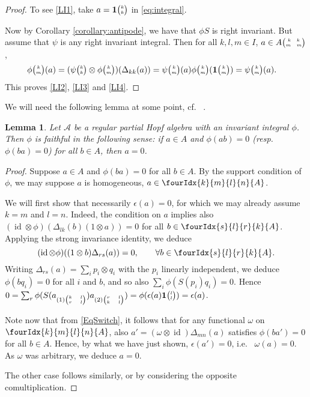 \documentclass[11pt]{article}
\DeclareMathOperator{\id}{id}
\newcommand{\Grt}[3]{#1{\tiny {\begin{pmatrix} #2\\#3\end{pmatrix}}}}
\newcommand{\UnitC}[2]{\Grt{\mathbf{1}}{#1}{#2}}
\newcommand{\pmat}[4]{{\tiny \begin{pmatrix} #1 \quad #2 \\ #3 \quad #4\end{pmatrix}}}
\newcommand{\Gr}[5]{\fourIdx{#2}{#4}{#3}{#5}{#1}}%
\newtheorem{Lem}[Theorem]{Lemma}
\theoremstyle{definition}
\newcommand{\phic}[2]{\Grt{\phi}{#1}{#2}}
\numberwithin{equation}{section}
\begin{document}
\begin{proof} 
To see \ref{LI1}, take $a=\UnitC{k}{k}$ in \eqref{eq:integral}. 

Now by Corollary \ref{corollary:antipode}, we have that $\phi S$ is right invariant. But assume that $\psi$ is any
 right invariant integral.     Then for all $k,l,m\in I$, $a\in A\pmat{k}{k}{m}{m}$,
    \begin{align*}
      \phic{k}{m}(a)  &= (\Grt{\psi}{k}{k} \otimes
      \phic{k}{m})(\Delta_{kk}(a)) = \Grt{\psi}{k}{m}(a)\Grt{\phi}{k}{m}(\UnitC{k}{m}) = \Grt{\psi}{k}{m}(a) .
    \end{align*}
  This proves \ref{LI2}, \ref{LI3} and \ref{LI4}.  
     \end{proof} 


We will need the following lemma at some point, cf.~ \cite[Proposition 3.4]{VDae2}.

\begin{Lem}\label{LemFaith} Let $\mathscr{A}$ be a regular partial Hopf
  algebra with an invariant integral $\phi$. Then
  $\phi$ is faithful in the following sense: if $a\in A$ and
  $\phi(ab) =0$ (resp. $\phi(ba)=0$) for all $b\in A$, then
  $a=0$.
\end{Lem} 

\begin{proof} Suppose $a\in A$ and $\phi(ba)=0$ for all $b\in A$. By the support condition of $\phi$, we may suppose $a$ is homogeneous, $a\in \Gr{A}{k}{l}{m}{n}$.

We will first show that necessarily $\epsilon(a)=0$, for which we may already assume $k=m$ and $l=n$. Indeed, the condition on $a$ implies also $(\id\otimes \phi)(\Delta_{lk}(b)(1\otimes a))=0$ for all $b\in \Gr{A}{s}{r}{l}{k}$. Applying the strong invariance identity, we deduce \begin{equation}\label{EqSwitch}(\id\otimes \phi)((1\otimes b)\Delta_{rs}(a))=0,\qquad \forall b\in \Gr{A}{s}{r}{l}{k}.\end{equation} Writing $\Delta_{rs}(a) = \sum_i p_i\otimes q_i$ with the $p_i$ linearly independent, we deduce $\phi(bq_i)=0$ for all $i$ and $b$, and so also $\sum_i \phi(S(p_i)q_i)=0$. Hence $0=\sum_r \phi(S(a_{(1){\tiny \begin{pmatrix} k & l \\ r & l \end{pmatrix}}})a_{(2){\tiny \begin{pmatrix} r & l \\ k & l\end{pmatrix}}}) = \phi(\epsilon(a) \UnitC{l}{l}) = \epsilon(a)$.

Note now that from \eqref{EqSwitch}, it follows that for any functional $\omega$ on $\Gr{A}{k}{l}{m}{n}$, also $a'=(\omega\otimes \id)\Delta_{mn}(a)$ satisfies $\phi(ba')=0$ for all $b\in A$. Hence, by what we have just shown, $\epsilon(a')=0$, i.e.~ $\omega(a)=0$. As $\omega$ was arbitrary, we deduce $a=0$.

The other case follows similarly, or by considering the opposite comultiplication.
\end{proof} 
\end{document}
